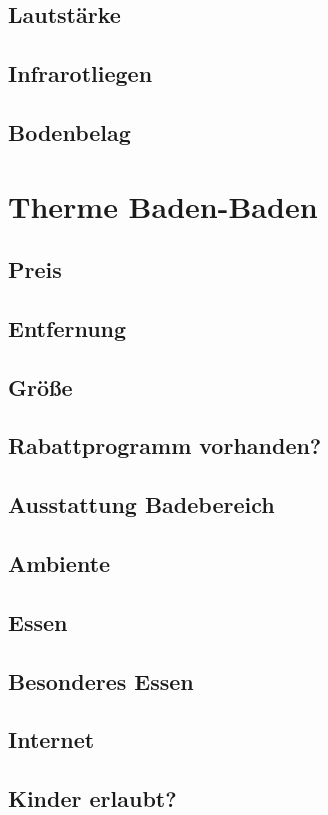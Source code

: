\documentclass{article}
\begin{document}
\subsection*{Lautstärke}
\subsection*{Infrarotliegen}
\subsection*{Bodenbelag}
\pagebreak

\section*{Therme Baden-Baden}
\subsection*{Preis}
\subsection*{Entfernung}
\subsection*{Größe}
\subsection*{Rabattprogramm vorhanden?}
\subsection*{Ausstattung Badebereich}
\subsection*{Ambiente}
\subsection*{Essen}
\subsection*{Besonderes Essen}
\subsection*{Internet}
\subsection*{Kinder erlaubt?}
\end{document}
